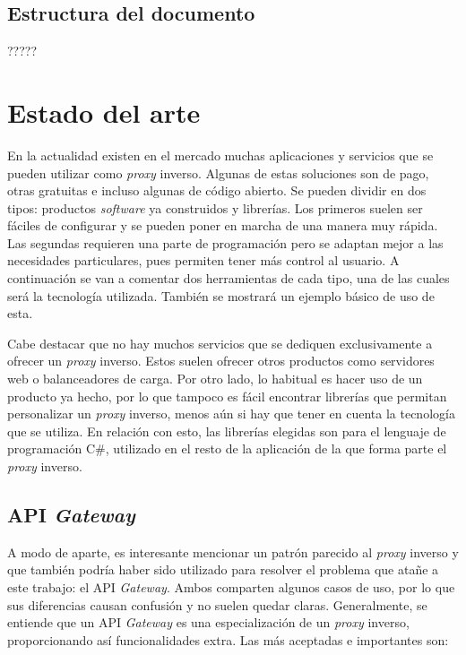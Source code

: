 \documentclass[11pt,spanish,listoffigures]{tfgetsinf}
\begin{document}

	\section{Estructura del documento}

?????


\chapter{Estado del arte}

En la actualidad existen en el mercado muchas aplicaciones y servicios que se pueden utilizar como \emph{proxy} inverso. Algunas de estas soluciones son de pago, otras gratuitas e incluso algunas de código abierto. Se pueden dividir en dos tipos: productos \emph{software} ya construidos y librerías. Los primeros suelen ser fáciles de configurar y se pueden poner en marcha de una manera muy rápida. Las segundas requieren una parte de programación pero se adaptan mejor a las necesidades particulares, pues permiten tener más control al usuario. A continuación se van a comentar dos herramientas de cada tipo, una de las cuales será la tecnología utilizada. También se mostrará un ejemplo básico de uso de esta.

Cabe destacar que no hay muchos servicios que se dediquen exclusivamente a ofrecer un \emph{proxy} inverso. Estos suelen ofrecer otros productos como servidores web o balanceadores de carga. Por otro lado, lo habitual es hacer uso de un producto ya hecho, por lo que tampoco es fácil encontrar librerías que permitan personalizar un \emph{proxy} inverso, menos aún si hay que tener en cuenta la tecnología que se utiliza. En relación con esto, las librerías elegidas son para el lenguaje de programación C\#, utilizado en el resto de la aplicación de la que forma parte el \emph{proxy} inverso.


	\section{API \emph{Gateway}}

A modo de aparte, es interesante mencionar un patrón parecido al \emph{proxy} inverso y que también podría haber sido utilizado para resolver el problema que atañe a este trabajo: el API \emph{Gateway}. Ambos comparten algunos casos de uso, por lo que sus diferencias causan confusión y no suelen quedar claras. Generalmente, se entiende que un API \emph{Gateway} es una especialización de un \emph{proxy} inverso, proporcionando así funcionalidades extra. Las más aceptadas e importantes son:
\end{document}
